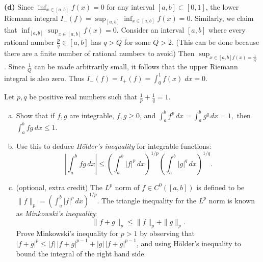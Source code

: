 \documentclass[11pt,letterpaper]{article}
\begin{document}
\begin{solution}
    \textbf{(d)} Since $\inf_{x\in [a, b]} f(x) = 0$ for any interval $[a,b]\subset [0,1]$, the lower Riemann integral $I_-(f) = \sup_{[a,b]} \inf_{x\in [a,b]} f(x) = 0$. Similarly, we claim that $\inf_{[a,b]} \sup_{x\in [a,b]}f(x) = 0$. Consider an interval $[a,b]$ where every rational number $\frac{p}{q}\in [a,b]$ has $q>Q$ for some $Q>2$. (This can be done because there are a finite number of rational numbers to avoid) Then $\sup_{x\in [a,b] f(x)=\frac{1}{Q}}$. Since $\frac{1}{Q}$ can be made arbitrarily small, it follows that the upper Riemann integral is also zero. Thus $I_-(f)=I_+(f)=\int_0^1f(x)\;dx = 0$.      
\end{solution}

\begin{problem}
    Let $p,q$ be positive real numbers such that $\frac{1}{p}+\frac{1}{q}=1$. 
    \begin{enumerate}[(a)]
        \item Show that if $f,g$ are integrable, $f,g\geq 0$, and $\int_a^b f^p\,dx = \int_a^b g^q\,dx = 1,$ then $\int_a^b fg\,dx \leq 1$.
        \item Use this to deduce {\em H\"older's inequality} for integrable functions: 
        \[
            \left|\int_a^b fg\,dx\right|\leq \left(\int_a^b |f|^p\,dx\right)^{1/p} \left(\int_a^b |g|^q\,dx\right)^{1/q}
        .\]
        \item (optional, extra credit) The $L^p$ norm of $f\in C^0([a,b])$ is defined to be $\|f\|_p=\left(\int_a^b |f|^p\,dx\right)^{1/p}$. The triangle inequality for the $L^p$ norm is known as {\em Minkowski's inequality}: $$\|f+g\|_p\leq \|f\|_p+\|g\|_p.$$ Prove Minkowski's inequality for $p>1$ by observing that $|f+g|^p\leq |f|\,|f+g|^{p-1}+|g|\,|f+g|^{p-1}$, and using H\"older's inequality to bound the integral of the right hand side.
    \end{enumerate}
\end{problem}
\end{document}
